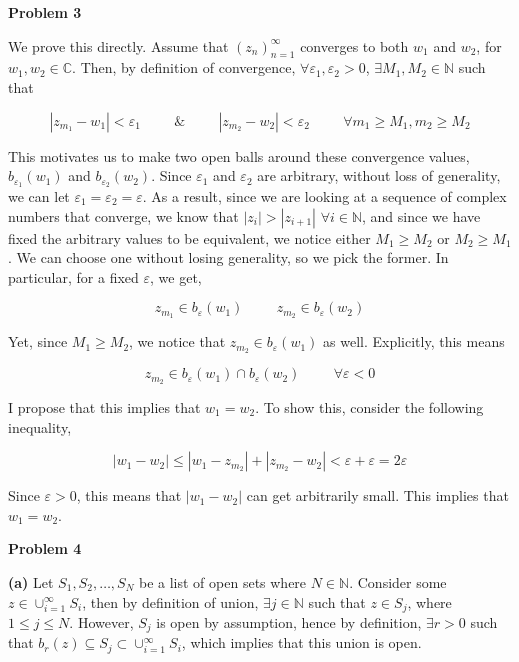 \documentclass[10pt]{article}
\newcommand{\C}{\mathbb{C}}
\newcommand{\N}{\mathbb{N}}
\begin{document}
\textbf{Problem 3}

We prove this directly. Assume that $(z_{n})_{n=1}^{\infty}$ converges to both $w_{1}$ and $w_{2}$, for $w_{1},w_{2} \in \C$. Then, by definition of convergence, $\forall \varepsilon_{1},\varepsilon_{2} > 0$, $\exists M_{1},M_{2}\in \N$ such that

$$|z_{m_{1}} - w_{1}| < \varepsilon_{1} \hspace{1cm} \& \hspace{1cm} |z_{m_{2}}-w_{2}|<\varepsilon_{2} \hspace{1cm} \forall m_{1} \geq M_{1}, m_{2} \geq M_{2}$$

This motivates us to make two open balls around these convergence values, $b_{\varepsilon_{1}}(w_{1})$ and $b_{\varepsilon_{2}}(w_{2})$. Since $\varepsilon_{1}$ and $\varepsilon_{2}$ are arbitrary, without loss of generality, we can let $\varepsilon_{1} = \varepsilon_{2} = \varepsilon$. As a result, since we are looking at a sequence of complex numbers that converge, we know that $|z_{i}| > |z_{i+1}|$ $\forall i\in \N$, and since we have fixed the arbitrary values to be equivalent, we notice either $M_{1} \geq M_{2}$ or $M_{2} \geq M_{1}$. We can choose one without losing generality, so we pick the former. In particular, for a fixed $\varepsilon$, we get,

$$z_{m_{1}}\in b_{\varepsilon}(w_{1}) \hspace{1cm} z_{m_{2}}\in b_{\varepsilon}(w_{2})$$

Yet, since $M_{1} \geq M_{2}$, we notice that $z_{m_{2}}\in b_{\varepsilon}(w_{1})$ as well. Explicitly, this means

$$z_{m_{2}} \in  b_{\varepsilon}(w_{1}) \cap b_{\varepsilon}(w_{2}) \hspace{1cm} \forall \varepsilon<0$$

I propose that this implies that $w_{1} = w_{2}$. To show this, consider the following inequality,

$$|w_{1} - w_{2}| \leq |w_{1} - z_{m_{2}}| + |z_{m_{2}} - w_{2}| < \varepsilon + \varepsilon = 2\varepsilon$$

Since $\varepsilon>0$, this means that $|w_{1} - w_{2}|$ can get arbitrarily small. This implies that $w_{1} = w_{2}$.

\textbf{Problem 4}

\textbf{(a)}
Let $S_{1}, S_{2}, \dots, S_{N}$ be a list of open sets where $N \in \N$. Consider some $z\in \cup_{i=1}^{\infty}S_{i}$, then by definition of union, $\exists j\in \N$ such that $z\in S_{j}$, where $1 \leq j\leq N$. However, $S_{j}$ is open by assumption, hence by definition, $\exists r > 0$ such that $b_{r}(z) \subseteq S_{j} \subset  \cup_{i=1}^{\infty}S_{i}$, which implies that this union is open.
\end{document}
